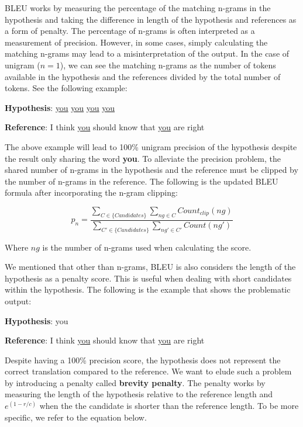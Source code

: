 BLEU works by measuring the percentage of the matching n-grams in the hypothesis and taking the difference in length of the hypothesis and references as a form of penalty. The percentage of n-grams is often interpreted as a measurement of precision. However, in some cases, simply calculating the matching n-grams may lead to a misinterpretation of the output. In the case of unigram ($n=1$), we can see the matching n-grams as the number of tokens available in the hypothesis and the references divided by the total number of tokens. See the following example:

\bigskip

\textbf{Hypothesis}: \underline{you} \underline{you} \underline{you} \underline{you}

\textbf{Reference}: I think \underline{you} should know that \underline{you} are right

\bigskip

The above example will lead to 100\% unigram precision of the hypothesis despite the result only sharing the word \textbf{you}. To alleviate the precision problem, the shared number of n-grams in the hypothesis and the reference must be clipped by the number of n-grams in the reference. The following is the updated BLEU formula after incorporating the n-gram clipping:

\begin{equation}
    p_n=\frac{\sum_{C\in\{Candidates\}}\sum_{ng\in C}Count_{clip}(ng)}{\sum_{C'\in\{Candidates\}}\sum_{ng'\in C'}Count(ng')}
\end{equation}

Where $ng$ is the number of n-grams used when calculating the score.

We mentioned that other than n-grams, BLEU is also considers the length of the hypothesis as a penalty score. This is useful when dealing with short candidates within the hypothesis. The following is the example that shows the problematic output:

\bigskip

\textbf{Hypothesis}: you

\textbf{Reference}: I think \underline{you} should know that \underline{you} are right

\bigskip

Despite having a 100\% precision score, the hypothesis does not represent the correct translation compared to the reference. We want to elude such a problem by introducing a penalty called \textbf{brevity penalty}. The penalty works by measuring the length of the hypothesis relative to the reference length and  $e^{(1-r/c)}$ when the the candidate is shorter than the reference length. To be more specific, we refer to the equation below.

